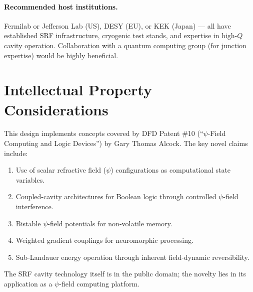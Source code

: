 \documentclass[12pt,a4paper]{article}
\begin{document}
\paragraph{Recommended host institutions.} Fermilab or Jefferson Lab (US), DESY (EU), or KEK (Japan) --- all have established SRF infrastructure, cryogenic test stands, and expertise in high-$Q$ cavity operation. Collaboration with a quantum computing group (for junction expertise) would be highly beneficial.

\section{Intellectual Property Considerations}

This design implements concepts covered by DFD Patent \#10 (``$\psi$-Field Computing and Logic Devices'') by Gary Thomas Alcock. The key novel claims include:

\begin{enumerate}
\item Use of scalar refractive field ($\psi$) configurations as computational state variables.
\item Coupled-cavity architectures for Boolean logic through controlled $\psi$-field interference.
\item Bistable $\psi$-field potentials for non-volatile memory.
\item Weighted gradient couplings for neuromorphic processing.
\item Sub-Landauer energy operation through inherent field-dynamic reversibility.
\end{enumerate}

The SRF cavity technology itself is in the public domain; the novelty lies in its application as a $\psi$-field computing platform.
\end{document}
